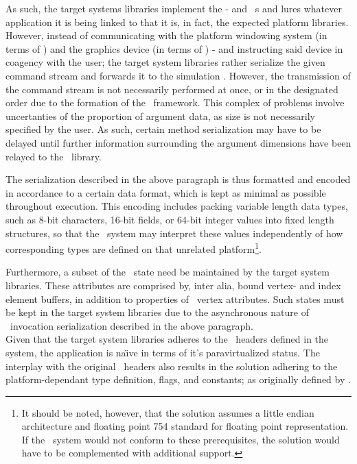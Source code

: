 As such, the target systems libraries implement the \dvttermegl - and \dvttermopenglestwopointo\ \dvttermapi s and lures whatever application it is being linked to that it is, in fact, the expected platform libraries.
However, instead of communicating with the platform windowing system (in terms of \dvttermegl ) and the graphics device (in terms of \dvttermopengl ) - and instructing said device in coagency with the user; the target system libraries rather serialize the given command stream and forwards it to the simulation \dvttermhost .
However, the transmission of the command stream is not necessarily performed at once, or in the designated order due to the formation of the \dvttermopenglestwopointo\ framework.
This complex of problems involve uncertanties of the proportion of argument data, as size is not necessarily specified by the user.
As such, certain method serialization may have to be delayed until further information surrounding the argument	dimensions have been relayed to the \dvttermopengl\ library.

The serialization described in the above paragraph is thus formatted and encoded in accordance to a certain data format, which is kept as minimal as possible throughout execution.
This encoding includes packing variable length data types, such as 8-bit characters, 16-bit fields, or 64-bit integer values into fixed length structures, so that the \dvttermhost\ system may interpret these values independently of how corresponding types are defined on that unrelated platform\footnote{It should be noted, however, that the solution assumes a little endian architecture and floating point 754 standard for floating point representation. If the \dvttermhost\ system would not conform to these prerequisites, the solution would have to be complemented with additional support.}.

Furthermore, a subset of the \dvttermopengl\ state need be maintained by the target system libraries.
These attributes are comprised by, inter alia, bound vertex- and index element buffers, in addition to properties of \dvttermopengl\ vertex attributes.
Such states must be kept in the target system libraries due to the asynchronous nature of \dvttermopengl\ invocation serialization described in the above paragraph.\\

\noindent
Given that the target system libraries adheres to the \dvttermopengl\ headers defined in the system, the application is na\"{\i}ve in terms of it's paravirtualized status.
The interplay with the original \dvttermopengles\ headers also results in the solution adhering to the platform-dependant type definition, flags, and constants; as originally defined by \dvttermkhronos .

